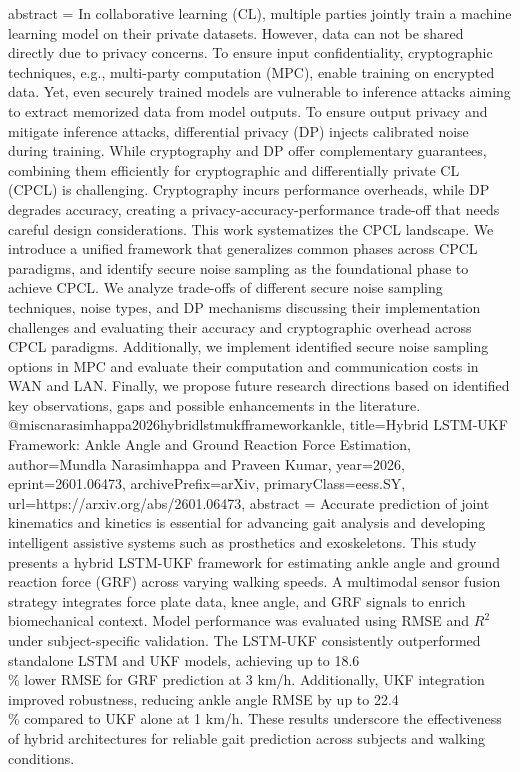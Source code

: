 {      abstract = {In collaborative learning (CL), multiple parties jointly train a machine learning model on their private datasets. However, data can not be shared directly due to privacy concerns. To ensure input confidentiality, cryptographic techniques, e.g., multi-party computation (MPC), enable training on encrypted data. Yet, even securely trained models are vulnerable to inference attacks aiming to extract memorized data from model outputs. To ensure output privacy and mitigate inference attacks, differential privacy (DP) injects calibrated noise during training. While cryptography and DP offer complementary guarantees, combining them efficiently for cryptographic and differentially private CL (CPCL) is challenging. Cryptography incurs performance overheads, while DP degrades accuracy, creating a privacy-accuracy-performance trade-off that needs careful design considerations. This work systematizes the CPCL landscape. We introduce a unified framework that generalizes common phases across CPCL paradigms, and identify secure noise sampling as the foundational phase to achieve CPCL. We analyze trade-offs of different secure noise sampling techniques, noise types, and DP mechanisms discussing their implementation challenges and evaluating their accuracy and cryptographic overhead across CPCL paradigms. Additionally, we implement identified secure noise sampling options in MPC and evaluate their computation and communication costs in WAN and LAN. Finally, we propose future research directions based on identified key observations, gaps and possible enhancements in the literature.}
}@misc{narasimhappa2026hybridlstmukfframeworkankle,
      title={Hybrid LSTM-UKF Framework: Ankle Angle and Ground Reaction Force Estimation}, 
      author={Mundla Narasimhappa and Praveen Kumar},
      year={2026},
      eprint={2601.06473},
      archivePrefix={arXiv},
      primaryClass={eess.SY},
      url={https://arxiv.org/abs/2601.06473},
      abstract = {Accurate prediction of joint kinematics and kinetics is essential for advancing gait analysis and developing intelligent assistive systems such as prosthetics and exoskeletons. This study presents a hybrid LSTM-UKF framework for estimating ankle angle and ground reaction force (GRF) across varying walking speeds. A multimodal sensor fusion strategy integrates force plate data, knee angle, and GRF signals to enrich biomechanical context. Model performance was evaluated using RMSE and $R^2$ under subject-specific validation. The LSTM-UKF consistently outperformed standalone LSTM and UKF models, achieving up to 18.6\\\% lower RMSE for GRF prediction at 3 km/h. Additionally, UKF integration improved robustness, reducing ankle angle RMSE by up to 22.4\\\% compared to UKF alone at 1 km/h. These results underscore the effectiveness of hybrid architectures for reliable gait prediction across subjects and walking conditions.}
}
